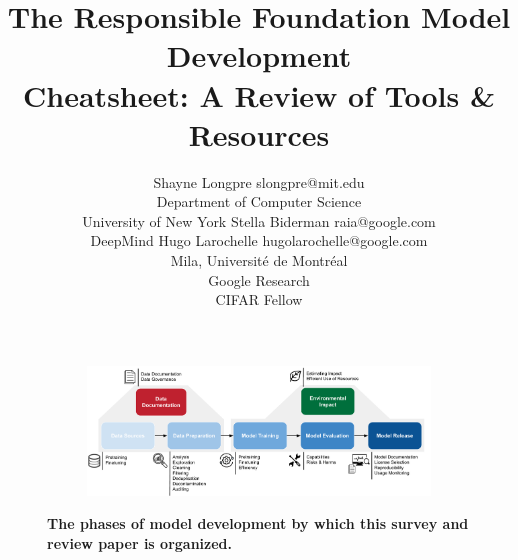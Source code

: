 \documentclass[10pt]{article} %
\title{The Responsible Foundation Model Development \\Cheatsheet: A Review of Tools \& Resources}
\author{\name Shayne Longpre \email slongpre@mit.edu \\
      \addr Department of Computer Science\\
      University of New York
      \AND
      \name Stella Biderman \email raia@google.com \\
      \addr DeepMind
      \AND
      \name Hugo Larochelle \email hugolarochelle@google.com\\
      \addr Mila, Universit\'e de Montr\'eal \\
      Google Research\\
      CIFAR Fellow}
\begin{document}
\maketitle


\begin{figure}[ht]
    \centering
    \begin{subfigure}{0.82\textwidth}
        \includegraphics[width=\textwidth]{../logos/Overview2.pdf}
    \end{subfigure}
    \caption{\textbf{The phases of model development by which this survey and review paper is organized.}}
    \label{fig:cheatsheet-flow}
\end{figure}




















\end{document}
